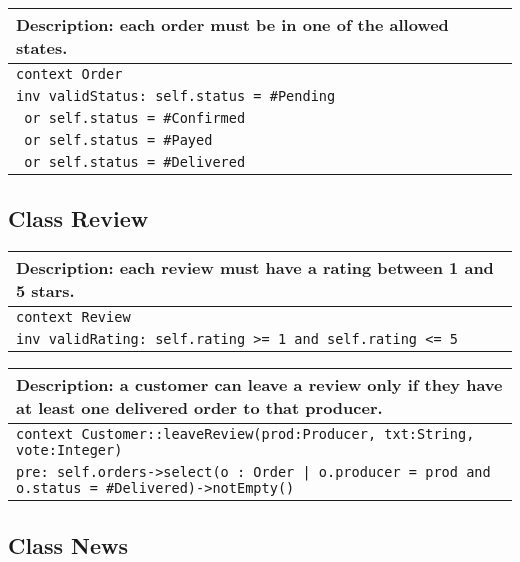\begin{table}[ht]
  \centering
  \begin{tabular}{p{}}
    \hline
    \textbf{Description:} each order must be in one of the allowed states.\\
    \hline
    \texttt{context Order}\\
    \texttt{inv validStatus: self.status = \#Pending}\\
    \texttt{              or self.status = \#Confirmed}\\
    \texttt{              or self.status = \#Payed}\\
    \texttt{              or self.status = \#Delivered}\\
    \hline
  \end{tabular}
\end{table}

\subsection{Class Review}

\begin{table}[ht]
  \centering
  \begin{tabular}{p{}}
    \hline
    \textbf{Description:} each review must have a rating between 1 and 5 stars.\\
    \hline
    \texttt{context Review}\\
    \texttt{inv validRating: self.rating >= 1 and self.rating <= 5}\\
    \hline
  \end{tabular}
\end{table}

\begin{table}[ht]
  \centering
  \begin{tabular}{p{}}
    \hline
    \textbf{Description:} a customer can leave a review only if they have at least one delivered order to that producer.\\
    \hline
    \texttt{context Customer::leaveReview(prod:Producer, txt:String, vote:Integer)}\\
    \texttt{pre: self.orders->select(o : Order | o.producer = prod and o.status = \#Delivered)->notEmpty()}\\
    \hline 
  \end{tabular}
\end{table}

\subsection{Class News}

